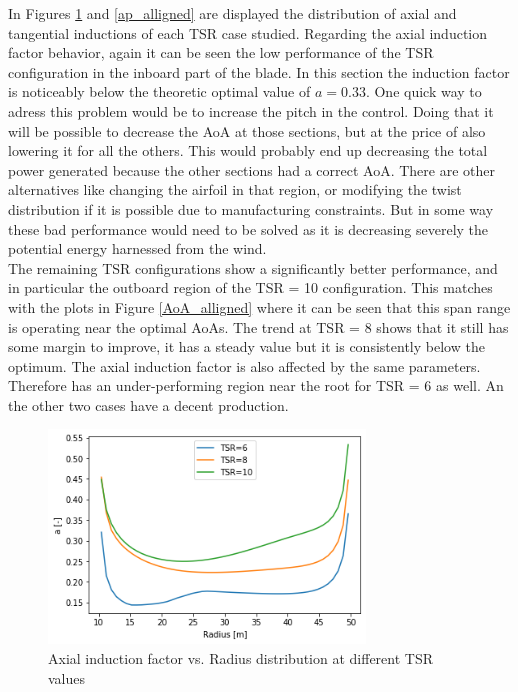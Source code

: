 In Figures \ref{a_alligned} and \ref{ap_alligned} are displayed the distribution of axial and tangential inductions of each TSR case studied. Regarding the axial induction factor behavior, again it can be seen the low performance of the TSR configuration in the inboard part of the blade. In this section the induction factor is noticeably below the theoretic optimal value of $a=0.33$. One quick way to adress this problem would be to increase the pitch in the control. Doing that it will be possible to decrease the AoA at those sections, but at the price of also lowering it for all the others. This would probably end up decreasing the total power generated because the other sections had a correct AoA. There are other alternatives like changing the airfoil in that region, or modifying the twist distribution if it is possible due to manufacturing constraints. But in some way these bad performance would need to be solved as it is decreasing severely the potential energy harnessed from the wind. \\

The remaining TSR configurations show a significantly better performance, and in particular the outboard region of the TSR = 10 configuration. This matches with the plots in Figure \ref{AoA_alligned} where it can be seen that this span range is operating near the optimal AoAs. The trend at TSR = 8 shows that it still has some margin to improve, it has a steady value but it is consistently below the optimum. The axial induction factor is also affected by the same parameters. Therefore has an under-performing region near the root for TSR = 6 as well. An the other two cases have a decent production.   \\

 
\begin{figure}[htbp]
\includegraphics[width=0.75\textwidth]{./img/a_plt_alligned.png}
\caption{Axial induction factor vs. Radius distribution at different TSR values}
\centering
\label{a_alligned}
\end{figure}

